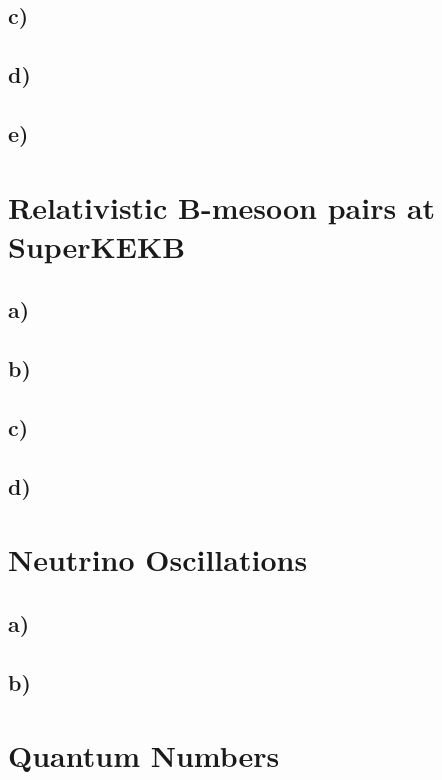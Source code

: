 \documentclass{article}
\begin{document}
\subsection*{c)}


\subsection*{d)}


\subsection*{e)}



\section{Relativistic B-mesoon pairs at SuperKEKB}
\subsection*{a)}


\subsection*{b)}


\subsection*{c)}


\subsection*{d)}




\section{Neutrino Oscillations}
\subsection*{a)}


\subsection*{b)}



\section{Quantum Numbers}
\end{document}
